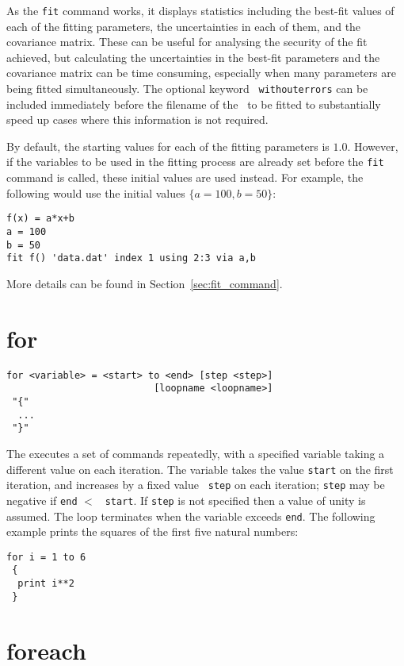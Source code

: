 As the {\tt fit} command works, it displays statistics including the best-fit
values of each of the fitting parameters, the uncertainties in each of them,
and the covariance matrix. These can be useful for analysing the security of
the fit achieved, but calculating the uncertainties in the best-fit parameters
and the covariance matrix can be time consuming, especially when many
parameters are being fitted simultaneously. The optional keyword {\tt
withouterrors} can be included immediately before the filename of the
\datafile\ to be fitted to substantially speed up cases where this information
is not required.

By default, the starting values for each of the fitting parameters is
$1.0$. However, if the variables to be used in the fitting process are already
set before the {\tt fit} command is called, these initial values are used
instead. For example, the following would use the initial values
$\{a=100,b=50\}$:
\begin{verbatim}
f(x) = a*x+b
a = 100
b = 50
fit f() 'data.dat' index 1 using 2:3 via a,b
\end{verbatim}

More details can be found in Section~\ref{sec:fit_command}.


\section{for}

\begin{verbatim}
for <variable> = <start> to <end> [step <step>]
                          [loopname <loopname>]
 "{"
  ...
 "}"
\end{verbatim}

The  executes a set of commands repeatedly, with a specified
variable taking a different value on each iteration. The variable takes the
value {\tt start} on the first iteration, and increases by a fixed value {\tt
step} on each iteration; {\tt step} may be negative if {\tt end} $<$ {\tt
start}. If {\tt step} is not specified then a value of unity is assumed. The
loop terminates when the variable exceeds {\tt end}.  The following example
prints the squares of the first five natural numbers:

\begin{verbatim}
for i = 1 to 6
 {
  print i**2
 }
\end{verbatim}


\section{foreach}

